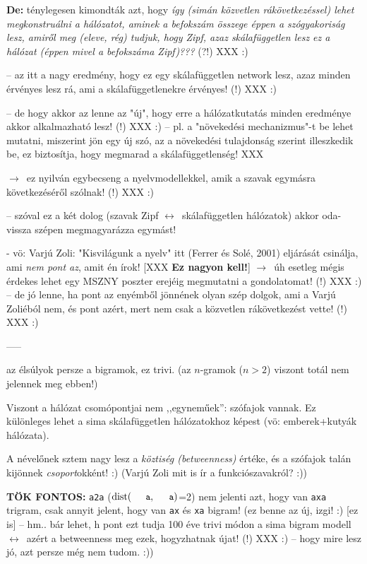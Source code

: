\documentclass{llncs}
\newcommand{\nyil}{$\rightarrow$\ }
\newcommand{\nnyil}{$\leftrightarrow$\ }
\newcommand{\code}[1]{\texttt{\small #1}}
\newcommand{\embf}[1]{\textbf{#1}}
\newcommand{\path}[1]{\code{#1}}
\DeclareMathOperator{\distop}{dist}
\newcommand{\dist}[2]{\ensuremath{\distop(\path{#1},\path{#2})}}
\newcommand{\XXX}[1]{{\small \color{megjcolor} [XXX #1]}}
\newcommand{\XXXb}[1]{\XXX{\embf{#1}}}
\newcommand{\smp}[1]{{\small (#1)}}
\begin{document}
 \embf{De:} ténylegesen kimondták azt, hogy
 \emph{így (simán közvetlen rákövetkezéssel)
 lehet megkonstruálni a hálózatot, aminek a befokszám összege
 éppen a szógyakoriság lesz, amiről meg (eleve, rég) tudjuk, hogy Zipf,
 azaz skálafüggetlen lesz ez a hálózat
 (éppen mivel a befokszáma Zipf)???} (?!) XXX :)

 -- az itt a nagy eredmény, hogy ez egy skálafüggetlen network lesz, azaz
    minden érvényes lesz rá, ami a skálafüggetlenekre érvényes! (!) XXX :)

 -- de hogy akkor az lenne az "új", hogy erre a hálózatkutatás
    minden eredménye akkor alkalmazható lesz! (!) XXX :)
    -- pl. a "növekedési mechanizmus"-t be lehet mutatni,
       miszerint jön egy új szó, az a növekedési tulajdonság szerint
       illeszkedik be, ez biztosítja, hogy megmarad a skálafüggetlenség! XXX

 \nyil ez nyilván egybecseng a nyelvmodellekkel,
    amik a szavak egymásra következéséről szólnak! (!) XXX :)

 -- szóval ez a két dolog (szavak Zipf \nnyil skálafüggetlen hálózatok)
    akkor oda-vissza szépen megmagyarázza egymást!

 - vö: Varjú Zoli: "Kisvilágunk a nyelv"
   itt (Ferrer és Solé, 2001) eljárását csinálja,
   ami  \emph{nem pont az}, amit én írok! \XXXb{Ez nagyon kell!}
   \nyil úh esetleg mégis érdekes lehet
      egy MSZNY poszter erejéig megmutatni a gondolatomat! (!) XXX :)
   -- de jó lenne, ha pont az enyémből jönnének olyan szép dolgok,
      ami a Varjú Zoliéból nem, és pont azért, mert
      nem csak a közvetlen rákövetkezést vette! (!) XXX :)

-----

az élsúlyok persze a bigramok, ez trivi.
\smp{az $n$-gramok ($n > 2$) viszont totál nem jelennek meg ebben!}

Viszont a hálózat csomópontjai nem ,,egyneműek'': szófajok vannak.
Ez különleges lehet a sima skálafüggetlen hálózatokhoz képest
(vö: emberek+kutyák hálózata).

A névelőnek sztem nagy lesz a \emph{köztiség (betweenness)} értéke,
és a szófajok talán kijönnek \emph{csoport}okként! :)
\smp{Varjú Zoli mit is ír a funkciószavakról? :)}

\embf{TÖK FONTOS:}
\path{a2a} (\dist{a}{a}=2) nem jelenti azt, hogy van \path{axa} trigram,
csak annyit jelent, hogy van \path{ax} és \path{xa} bigram!
\smp{ez benne az új, izgi! :) [ez is]
-- hm.. bár lehet, h pont ezt tudja
   100 éve trivi módon a sima bigram modell
   \nnyil azért a betweenness meg ezek, hogyzhatnak újat! (!) XXX :)
-- hogy mire lesz jó, azt persze még nem tudom. :)}
\end{document}
